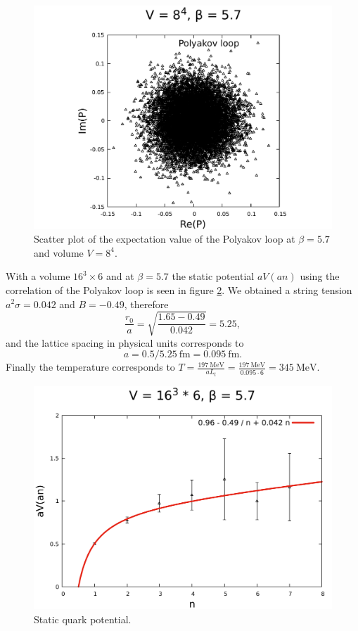 \documentclass[12pt,a4paper]{article}
\begin{document}
\begin{center}
\begin{figure}
\includegraphics[scale=0.6]{../images/polyakov_loop_beta=57.pdf}
\caption{Scatter plot of the expectation value of the Polyakov loop at $\beta = 5.7$ and volume $V = 8^4$.}
\label{fig:poly}
\end{figure}
\end{center}


With a volume $16^3 \times 6$ and at $\beta = 5.7$ the static potential $aV(an)$ using the correlation of the Polyakov loop is seen in figure \ref{fig:correlation_polyakov}. We obtained a string tension $a^2\sigma = 0.042$ and $B = -0.49$, therefore
\begin{equation}
	\frac{r_0}{a} = \sqrt{\frac{1.65 - 0.49}{0.042}} = 5.25,
\end{equation}
and the lattice spacing in physical units corresponds to
\begin{equation}
	a = 0.5/ 5.25 \ \text{fm} = 0.095 \ \text{fm}.
\end{equation}
Finally the temperature corresponds to $T = \frac{197 \ \text{MeV}}{aL_t}  = \frac{197\ \text{MeV}}{0.095 \cdot 6} = 345 \ \text{MeV}$.
\begin{figure}
\includegraphics[scale=0.6]{../images/correlation_polyakov.pdf}
\caption{Static quark potential.}
\label{fig:correlation_polyakov}
\end{figure}
\end{document}
